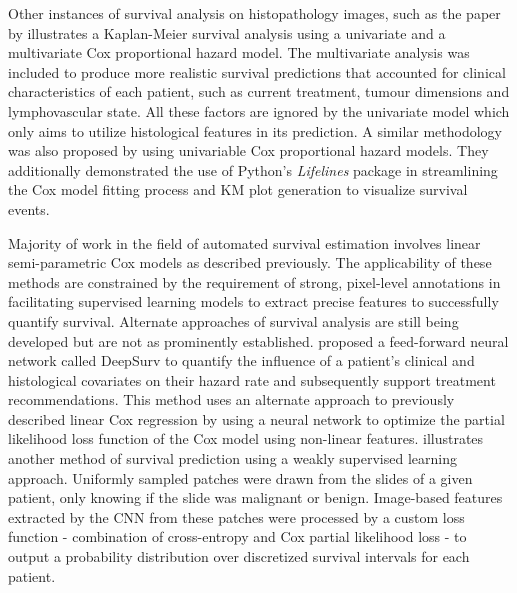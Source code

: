 \documentclass{l4proj}
\begin{document}
Other instances of survival analysis on histopathology images, such as the paper by \cite{Wetstein2022} illustrates a Kaplan-Meier survival analysis using a univariate and a multivariate Cox proportional hazard model. The multivariate analysis was included to produce more realistic survival predictions that accounted for clinical characteristics of each patient, such as current treatment, tumour dimensions and lymphovascular state. All these factors are ignored by the univariate model which only aims to utilize histological features in its prediction. A similar methodology was also proposed by \cite{Liu2022} using univariable Cox proportional hazard models. They additionally demonstrated the use of Python's \textit{Lifelines} package in streamlining the Cox model fitting process and KM plot generation to visualize survival events. 

Majority of work in the field of automated survival estimation involves linear semi-parametric Cox models as described previously. The applicability of these methods are constrained by the requirement of strong, pixel-level annotations in facilitating supervised learning models to extract precise features to successfully quantify survival. Alternate approaches of survival analysis are still being developed but are not as prominently established.  \cite{katzman2018deepsurv} proposed a feed-forward neural network called DeepSurv to quantify the influence of a patient's clinical and histological covariates on their hazard rate and subsequently support treatment recommendations. This method uses an alternate approach to  previously described linear Cox regression by using a neural network to optimize the partial likelihood loss function of the Cox model using non-linear features. \cite{wulczyn2020deep} illustrates another method of survival prediction using a weakly supervised learning approach. Uniformly sampled patches were drawn from the slides of a given patient, only knowing if the slide was malignant or benign. Image-based features extracted by the CNN from these patches were processed by a custom loss function - combination of cross-entropy and Cox partial likelihood loss - to output a probability distribution over discretized survival intervals for each patient.
\end{document}
